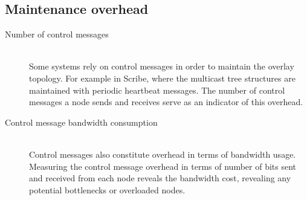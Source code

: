 \subsection{Maintenance overhead}

\begin{description}
\item[Number of control messages]\hfill\\

Some systems rely on control messages in order to maintain the overlay
topology. For example in Scribe, where the multicast tree structures are
maintained with periodic heartbeat messages. The number of control
messages a node sends and receives serve as an indicator of this
overhead.

\item[Control message bandwidth consumption]\hfill\\

Control messages also constitute overhead in terms of bandwidth usage.
Measuring the control message overhead in terms of number of bits sent
and received from each node reveals the bandwidth cost, revealing any
potential bottlenecks or overloaded nodes.

\end{description}
